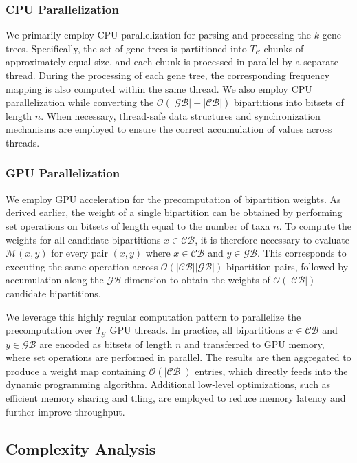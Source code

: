 \documentclass[runningheads]{llncs}
\begin{document}
\subsubsection{CPU Parallelization}

We primarily employ CPU parallelization for parsing and processing the $k$ gene trees. Specifically, the set of gene trees is partitioned into $T_\mathcal{C}$ chunks of approximately equal size, and each chunk is processed in parallel by a separate thread. During the processing of each gene tree, the corresponding frequency mapping is also computed within the same thread. We also employ CPU parallelization while converting the $\mathcal{O}(|\mathcal{GB}|+|\mathcal{CB}|)$ bipartitions into bitsets of length $n$. When necessary, thread-safe data structures and synchronization mechanisms are employed to ensure the correct accumulation of values across threads.


\subsubsection{GPU Parallelization}

We employ GPU acceleration for the precomputation of bipartition weights. As derived earlier, the weight of a single bipartition can be obtained by performing set operations on bitsets of length equal to the number of taxa $n$. To compute the weights for all candidate bipartitions $x \in \mathcal{CB}$, it is therefore necessary to evaluate $\mathcal{M}(x,y)$ for every pair $(x,y)$ where $x \in \mathcal{CB}$ and $y \in \mathcal{GB}$. This corresponds to executing the same operation across $\mathcal{O}(|\mathcal{CB}||\mathcal{GB}|)$ bipartition pairs, followed by accumulation along the $\mathcal{GB}$ dimension to obtain the weights of $\mathcal{O}(|\mathcal{CB}|)$ candidate bipartitions.  

We leverage this highly regular computation pattern to parallelize the precomputation over $T_\mathcal{G}$ GPU threads. In practice, all bipartitions $x \in \mathcal{CB}$ and $y \in \mathcal{GB}$ are encoded as bitsets of length $n$ and transferred to GPU memory, where set operations are performed in parallel. The results are then aggregated to produce a weight map containing $\mathcal{O}(|\mathcal{CB}|)$ entries, which directly feeds into the dynamic programming algorithm. Additional low-level optimizations, such as efficient memory sharing and tiling, are employed to reduce memory latency and further improve throughput.


\subsection{Complexity Analysis}
\end{document}
